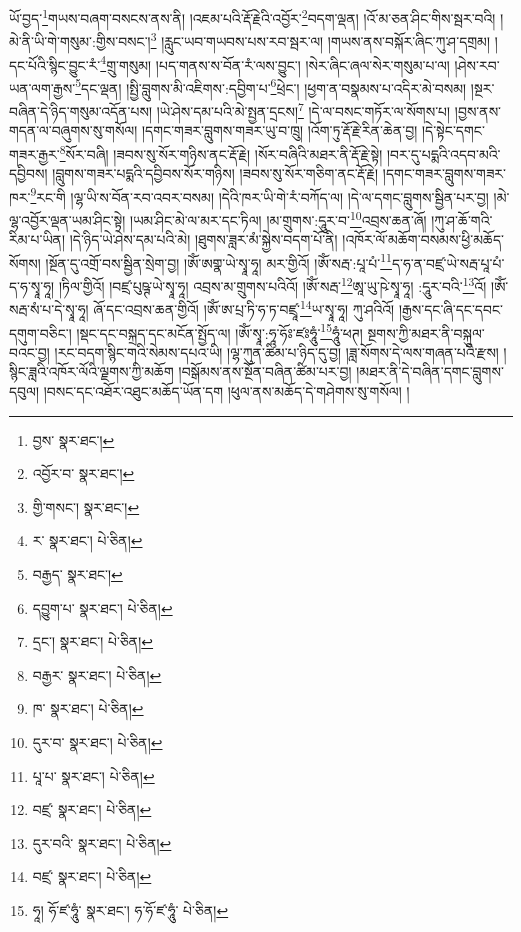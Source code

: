 ཡོ་བྱད་\footnote{བྱས་  སྣར་ཐང་། }གཡས་བཞག་བསངས་ནས་ནི། །འཇམ་པའི་རྡོ་རྗེའི་འབྱོར་\footnote{འབྱོར་བ་  སྣར་ཐང་། }བདག་ལྡན། །འོ་མ་ཅན་ཤིང་གིས་སྦར་བའི། །མེ་ནི་ཡི་གེ་གསུམ་:གྱིས་བསང་།\footnote{གྱི་གསང་།  སྣར་ཐང་། } །རླུང་ཡབ་གཡབས་པས་རབ་སྦར་ལ། །གཡས་ནས་བསྐོར་ཞིང་ཀུ་ཤ་དགྲམ། །དང་པོའི་སྙིང་བྱུང་རཾ་\footnote{ར་  སྣར་ཐང་།  པེ་ཅིན། }གྲུ་གསུམ། །པད་གནས་ས་བོན་རཾ་ལས་བྱུང་། །སེར་ཞིང་ཞལ་སེར་གསུམ་པ་ལ། །ཤེས་རབ་ཡན་ལག་རྒྱས་\footnote{བརྒྱད་  སྣར་ཐང་། }དང་ལྡན། །སྤྱི་བླུགས་མི་འཇིགས་:དབྱིག་པ་\footnote{དབྱུག་པ་  སྣར་ཐང་།  པེ་ཅིན། }ཕྲེང་། །ཕྱག་ན་བསྣམས་པ་འདིར་མེ་བསམ། །སྔར་བཞིན་དེ་ཉིད་གསུམ་འདོན་པས། །ཡེ་ཤེས་དམ་པའི་མེ་སྤྱན་དྲངས།\footnote{དྲང་།  སྣར་ཐང་།  པེ་ཅིན། } །དེ་ལ་བསང་གཏོར་ལ་སོགས་པ། །བྱས་ནས་གདན་ལ་བཞུགས་སུ་གསོལ། །དགང་གཟར་བླུགས་གཟར་ཡུ་བ་ཁྲུ། །འོག་ཏུ་རྡོ་རྗེ་རིན་ཆེན་བྱ། །དེ་སྟེང་དགང་གཟར་རྒྱར་\footnote{བརྒྱར་  སྣར་ཐང་།  པེ་ཅིན། }སོར་བཞི། །ཟབས་སུ་སོར་གཉིས་ནང་རྡོ་རྗེ། །སོར་བཞིའི་མཐར་ནི་རྡོ་རྗེ་སྟེ། །བར་དུ་པདྨའི་འདབ་མའི་དབྱིབས། །བླུགས་གཟར་པདྨའི་དབྱིབས་སོར་གཉིས། །ཟབས་སུ་སོར་གཅིག་ནང་རྡོ་རྗེ། །དགང་གཟར་བླུགས་གཟར་ཁར་\footnote{ཁ་  སྣར་ཐང་།  པེ་ཅིན། }རང་གི །ལྷ་ཡི་ས་བོན་རབ་འབར་བསམ། །དེའི་ཁར་ཡི་གེ་རཾ་བཀོད་ལ། །དེ་ལ་དགང་བླུགས་སྦྱིན་པར་བྱ། །མེ་ལྷ་འབྱོར་ལྡན་ཡམ་ཤིང་སྟེ། །ཡམ་ཤིང་མེ་ལ་མར་དང་ཏིལ། །མ་གྲུགས་:དཱུར་བ་\footnote{དུར་བ་  སྣར་ཐང་།  པེ་ཅིན། }འབྲས་ཆན་ཞོ། །ཀུ་ཤ་ཆོ་གའི་རིམ་པ་ཡིན། །དེ་ཉིད་ཡེ་ཤེས་དམ་པའི་མེ། །ཐུགས་ཟླར་མཾ་སྐྱེས་བདག་པོ་ནི། །འཁོར་ལོ་མཆོག་བསམས་ཕྱི་མཆོད་སོགས། །སྔོན་དུ་འགྲོ་བས་སྦྱིན་སྲེག་བྱ། །ཨོཾ་ཨགྣ་ཡེ་སྭཱ་ཧཱ། མར་གྱིའོ། །ཨོཾ་སརྦ་:པཱ་པཾ་\footnote{པཱ་པ་  སྣར་ཐང་།  པེ་ཅིན། }ད་ཧ་ན་བཛྲ་ཡེ་སརྦ་པཱ་པཾ་ད་ཧ་སྭཱ་ཧཱ། །ཏིལ་གྱིའོ། །བཛྲ་པུཥྚ་ཡེ་སྭཱ་ཧཱ། འབྲས་མ་གྲུགས་པའིའོ། །ཨོཾ་སརྦ་\footnote{བཛྲ་  སྣར་ཐང་།  པེ་ཅིན། }ཨཱ་ཡུ་ཥེ་སྭཱ་ཧཱ། :དཱུར་བའི་\footnote{དུར་བའི་  སྣར་ཐང་།  པེ་ཅིན། }འོ། །ཨོཾ་སརྦ་སཾ་པ་དེ་སྭཱ་ཧཱ། ཞོ་དང་འབྲས་ཆན་གྱིའོ། །ཨོཾ་ཨ་པྲ་ཏི་ཧ་ཏ་བཛྲཱ་\footnote{བཛྲ་  སྣར་ཐང་།  པེ་ཅིན། }ཡ་སྭཱ་ཧཱ། ཀུ་ཤའིའོ། །རྒྱས་དང་ཞི་དང་དབང་དགུག་བཅིང་། །སྡང་དང་བསྐྲད་དང་མངོན་སྤྱོད་ལ། །ཨོཾ་སྭཱ་:ཧཱ་ཧོཿ་ཛཿཧཱུཾ་\footnote{ཧཱ། ཧོ་ཛ་ཧཱུཾ་  སྣར་ཐང་། ཧ་ཧོ་ཛ་ཧཱུཾ་  པེ་ཅིན། }ཧཱུཾ་ཕཊ། སྔགས་ཀྱི་མཐར་ནི་བསྐུལ་བའང་བྱ། །རང་བདག་སྙིང་གའི་སེམས་དཔའ་ཡི། །ལྷ་ཀུན་ཚིམ་པ་ཉིད་དུ་བྱ། །ཟླ་སོགས་དེ་ལས་གཞན་པའི་རྫས། །སྙིང་ཟླའི་འཁོར་ལོའི་ལྗགས་ཀྱི་མཆོག །བསྒོམས་ནས་སྔོན་བཞིན་ཚིམ་པར་བྱ། །མཐར་ནི་དེ་བཞིན་དགང་བླུགས་དབུལ། །བསང་དང་འཐོར་འཐུང་མཆོད་ཡོན་དག །ཕུལ་ནས་མཆོད་དེ་གཤེགས་སུ་གསོལ། །
